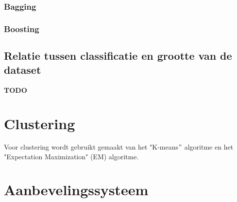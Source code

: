 \subsubsection{Bagging}
\subsubsection{Boosting}

\subsection{Relatie tussen classificatie en grootte van de dataset}
\textbf{TODO}

\section{Clustering}
Voor clustering wordt gebruikt gemaakt van het "K-means$"$ algoritme en het "Expectation Maximization" (EM) algoritme. 

\section{Aanbevelingssysteem}